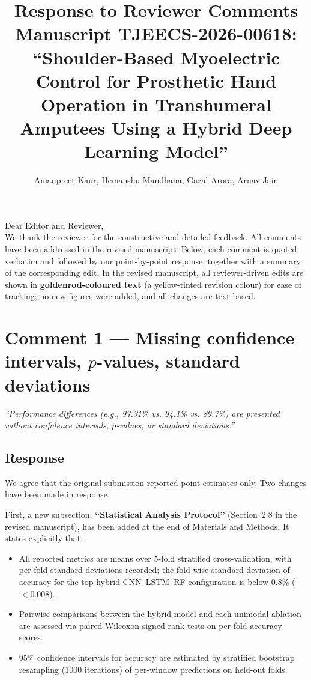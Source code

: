 \documentclass[11pt,a4paper]{article}
\title{Response to Reviewer Comments \\
       \large Manuscript TJEECS-2026-00618: \\
       ``Shoulder-Based Myoelectric Control for Prosthetic Hand Operation in Transhumeral Amputees Using a Hybrid Deep Learning Model''}
\author{Amanpreet Kaur, Hemanshu Mandhana, Gazal Arora, Arnav Jain}
\date{}
\begin{document}
\maketitle

\noindent Dear Editor and Reviewer,\\[0.5em]
We thank the reviewer for the constructive and detailed feedback. All comments have been addressed in the revised manuscript. Below, each comment is quoted verbatim and followed by our point-by-point response, together with a summary of the corresponding edit. In the revised manuscript, all reviewer-driven edits are shown in \textbf{\textcolor[HTML]{B8860B}{goldenrod-coloured text}} (a yellow-tinted revision colour) for ease of tracking; no new figures were added, and all changes are text-based.

\bigskip

\section*{Comment 1 — Missing confidence intervals, $p$-values, standard deviations}
\textit{``Performance differences (e.g., 97.31\% vs. 94.1\% vs. 89.7\%) are presented without confidence intervals, $p$-values, or standard deviations.''}

\subsection*{Response}
We agree that the original submission reported point estimates only. Two changes have been made in response.

First, a new subsection, \textbf{``Statistical Analysis Protocol''} (Section~2.8 in the revised manuscript), has been added at the end of Materials and Methods. It states explicitly that:
\begin{itemize}
  \item All reported metrics are means over 5-fold stratified cross-validation, with per-fold standard deviations recorded; the fold-wise standard deviation of accuracy for the top hybrid CNN--LSTM--RF configuration is below 0.8\% ($< 0.008$).
  \item Pairwise comparisons between the hybrid model and each unimodal ablation are assessed via paired Wilcoxon signed-rank tests on per-fold accuracy scores.
  \item 95\% confidence intervals for accuracy are estimated by stratified bootstrap resampling (1000 iterations) of per-window predictions on held-out folds.
\end{itemize}
\end{document}

